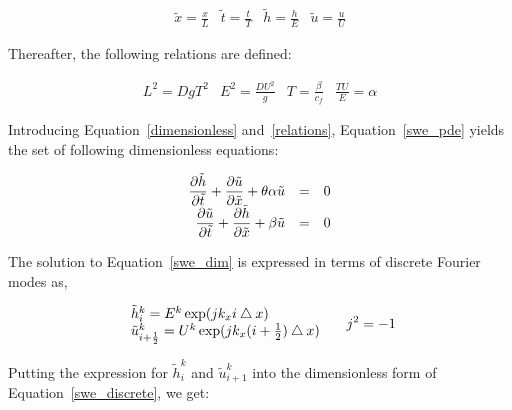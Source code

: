 \begin{equation}
\label{dimensionless}
\begin{array}{cccc}
\displaystyle \tilde{x} = \frac{x}{L}  & \displaystyle \tilde{t} = \frac{t}{T} & \displaystyle \tilde{h} = \frac{h}{E} & \displaystyle \tilde{u} = \frac{u}{U}
\end{array}
\end{equation} 

Thereafter, the following relations are defined:

\begin{equation}
\label{relations}
\begin{array}{cccc}
\displaystyle L^2 = DgT^2 & \displaystyle E^2 = \frac{DU^2}{g}  & \displaystyle T = \frac{\beta}{c_f} & \displaystyle \frac{TU}{E} = \alpha
\end{array}
\end{equation}

Introducing Equation~\ref{dimensionless} and~\ref{relations}, Equation~\ref{swe_pde} yields the set of following dimensionless equations:

\begin{equation}
\label{swe_dim}
\begin{array}{r c l}
\displaystyle \frac{\partial \tilde{h}}{\partial \tilde{t}} +  \frac{\partial \tilde{u}}{\partial \tilde{x}} + \theta \alpha \tilde{u} & =  & 0 \\
\displaystyle \frac{\partial \tilde{u}}{\partial \tilde{t}} +  \frac{\partial \tilde{h}}{\partial \tilde{x}} + \beta \tilde{u} & =  & 0 \\
\end{array}
\end{equation}

The solution to Equation~\ref{swe_dim} is expressed in terms of discrete Fourier modes as,

\begin{equation}
\label{fourier}
\begin{array}{l}
\tilde{h}_{i}^{k} = E^k \exp(j k_x i \bigtriangleup x) \\
\tilde{u}_{i+\frac{1}{2}}^{k} = U^k \exp(j k_x (i+\frac{1}{2}) \bigtriangleup x)
\end{array} \hspace{5mm} j^2 = -1
\end{equation}

Putting the expression for $\tilde{h}_{i}^{k}$ and $\tilde{u}_{i+1}^{k}$ into the dimensionless form of Equation~\ref{swe_discrete}, we get:

